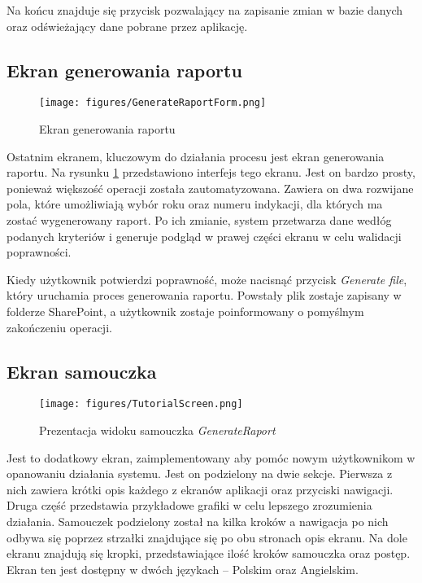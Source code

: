  Na końcu znajduje się przycisk pozwalający na zapisanie zmian w bazie danych oraz odświeżający dane pobrane przez aplikację.

 \subsection{Ekran generowania raportu}

 \begin{figure}[H]
     \centering
     \texttt{[image: figures/GenerateRaportForm.png]}
     \caption{Ekran generowania raportu}
     \label{fig:generateraportform}
 \end{figure}

 Ostatnim ekranem, kluczowym do działania procesu jest ekran generowania raportu. Na rysunku \ref{fig:generateraportform} przedstawiono interfejs tego ekranu. Jest on bardzo prosty, ponieważ większość operacji została zautomatyzowana. Zawiera on dwa rozwijane pola, które umożliwiają wybór roku oraz numeru indykacji, dla których ma zostać wygenerowany raport. Po ich zmianie, system przetwarza dane wedłóg podanych kryteriów i generuje podgląd w prawej części ekranu w celu walidacji poprawności.

 Kiedy użytkownik potwierdzi poprawność, może nacisnąć przycisk \emph{Generate file}, który uruchamia proces generowania raportu. Powstały plik zostaje zapisany w folderze SharePoint, a użytkownik zostaje poinformowany o pomyślnym zakończeniu operacji.

 \subsection{Ekran samouczka}

 \begin{figure}[H]
    \centering
    \texttt{[image: figures/TutorialScreen.png]}
    \caption{Prezentacja widoku samouczka \emph{GenerateRaport}}
    \label{fig:tutorial}
\end{figure}

Jest to dodatkowy ekran, zaimplementowany aby pomóc nowym użytkownikom w opanowaniu działania systemu. Jest on podzielony na dwie sekcje. Pierwsza z nich zawiera krótki opis każdego z ekranów aplikacji oraz przyciski nawigacji. Druga część przedstawia przykładowe grafiki w celu lepszego zrozumienia działania. Samouczek podzielony został na kilka kroków a nawigacja po nich odbywa się poprzez strzałki znajdujące się po obu stronach opis ekranu. Na dole ekranu znajdują się kropki, przedstawiające ilość kroków samouczka oraz postęp. Ekran ten jest dostępny w dwóch językach -- Polskim oraz Angielskim.
